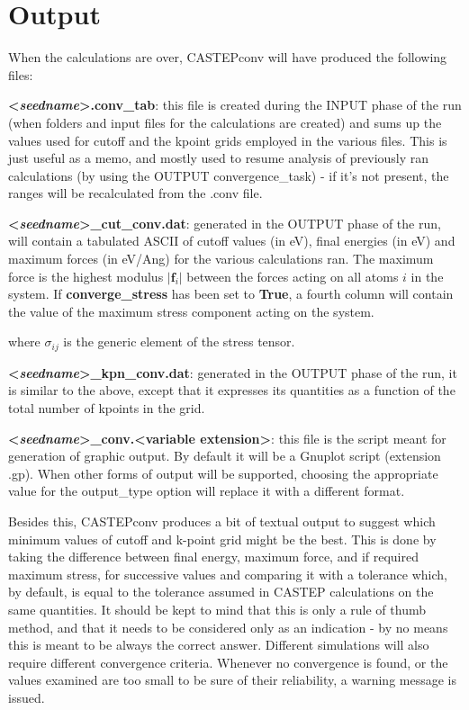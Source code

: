 \documentclass[10pt]{article}
\begin{document}
\section{Output}

When the calculations are over, CASTEPconv will have produced the following files:

\textbf{\textless \textit{seedname}\textgreater.conv\_tab}: this file is created during the INPUT phase of the run (when folders and input files for the calculations are created) and sums up the values used for cutoff and the kpoint grids employed in the various files. This is just useful as a memo, and mostly used to resume analysis of previously ran calculations (by using the OUTPUT convergence\_task) - if it's not present, the ranges will be recalculated from the .conv file.

\textbf{\textless \textit{seedname}\textgreater\_cut\_conv.dat}: generated in the OUTPUT phase of the run, will contain a tabulated ASCII of cutoff values (in eV), final energies (in eV) and maximum forces (in eV/Ang) for the various calculations ran. The maximum force is the highest modulus $|\mathbf{f}_i|$ between the forces acting on all atoms $i$ in the system. If \textbf{converge\_stress} has been set to \textbf{True}, a fourth column will contain the value of the maximum stress component acting on the system.

where $\sigma_{ij}$ is the generic element of the stress tensor.

\textbf{\textless \textit{seedname}\textgreater\_kpn\_conv.dat}: generated in the OUTPUT phase of the run, it is similar to the above, except that it expresses its quantities as a function of the total number of kpoints in the grid.

\textbf{\textless \textit{seedname}\textgreater\_conv.\textless variable extension\textgreater}: this file is the script meant for generation of graphic output. By default it will be a Gnuplot script (extension .gp). When other forms of output will be supported, choosing the appropriate value for the output\_type option will replace it with a different format.

Besides this, CASTEPconv produces a bit of textual output to suggest which minimum values of cutoff and k-point grid might be the best. This is done by taking the difference between final energy, maximum force, and if required maximum stress, for successive values and comparing it with a tolerance which, by default, is equal to the tolerance assumed in CASTEP calculations on the same quantities. It should be kept to mind that this is only a rule of thumb method, and that it needs to be considered only as an indication - by no means this is meant to be always the correct answer. Different simulations will also require different convergence criteria. Whenever no convergence is found, or the values examined are too small to be sure of their reliability, a warning message is issued.
\end{document}
